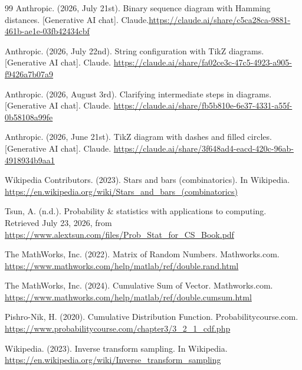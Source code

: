 \documentclass{article}
\theoremstyle{definition}
\theoremstyle{remark}
\numberwithin{equation}{section}
\begin{document}
\begin{thebibliography}{99}
Anthropic. (2026, July 21st). Binary sequence diagram with Hamming distances. [Generative AI chat]. Claude.\url{https://claude.ai/share/c5ca28ca-9881-461b-ae1e-03fb42434cbf}

Anthropic. (2026, July 22nd). String configuration with TikZ diagrams. [Generative AI chat]. Claude. \url{https://claude.ai/share/fa02ce3c-47c5-4923-a905-f9426a7b07a9}

Anthropic. (2026, August 3rd). Clarifying intermediate steps in diagrams. [Generative AI chat]. Claude. \url{https://claude.ai/share/fb5b810e-6e37-4331-a55f-0b58108a99fe}

Anthropic. (2026, June 21st). TikZ diagram with dashes and filled circles. [Generative AI chat]. Claude. \url{https://claude.ai/share/3f648ad4-eacd-420c-96ab-4918934b9aa1}

Wikipedia Contributors. (2023). Stars and bars (combinatorics). In Wikipedia. \url{https://en.wikipedia.org/wiki/Stars_and_bars_(combinatorics)}


Tsun, A. (n.d.). Probability \& statistics with applications to computing. Retrieved July 23, 2026, from \url{https://www.alextsun.com/files/Prob_Stat_for_CS_Book.pdf}

The MathWorks, Inc. (2022). Matrix of Random Numbers. Mathworks.com. \url{https://www.mathworks.com/help/matlab/ref/double.rand.html}

The MathWorks, Inc. (2024). Cumulative Sum of Vector. Mathworks.com. \url{https://www.mathworks.com/help/matlab/ref/double.cumsum.html}


Pishro-Nik, H. (2020). Cumulative Distribution Function. Probabilitycourse.com. \url{https://www.probabilitycourse.com/chapter3/3_2_1_cdf.php}

Wikipedia. (2023). Inverse transform sampling. In Wikipedia. \url{https://en.wikipedia.org/wiki/Inverse_transform_sampling}


\end{thebibliography}
\end{document}
